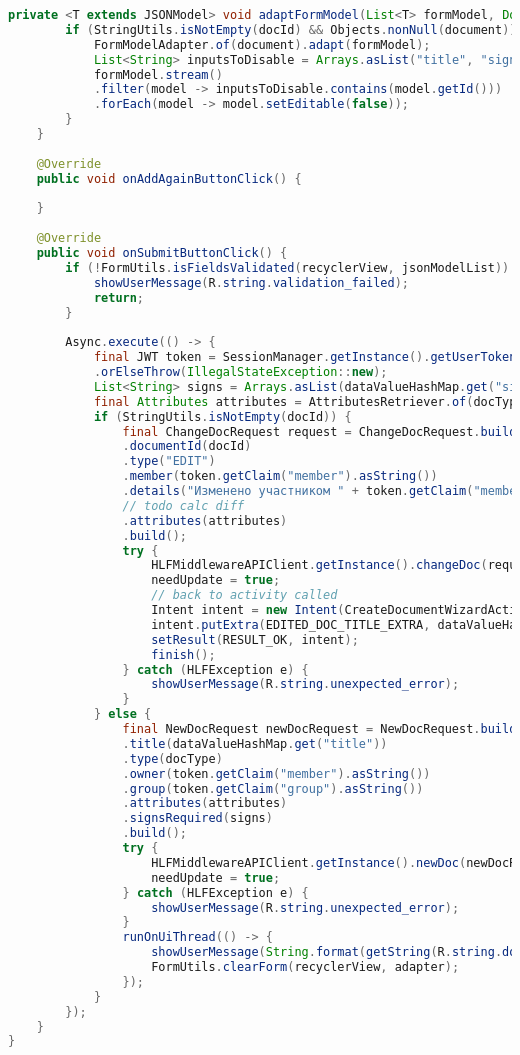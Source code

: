 \begin{lstlisting}[language=Java]
	private <T extends JSONModel> void adaptFormModel(List<T> formModel, Document document) {
		if (StringUtils.isNotEmpty(docId) && Objects.nonNull(document)) {
			FormModelAdapter.of(document).adapt(formModel);
			List<String> inputsToDisable = Arrays.asList("title", "signs");
			formModel.stream()
			.filter(model -> inputsToDisable.contains(model.getId()))
			.forEach(model -> model.setEditable(false));
		}
	}
	
	@Override
	public void onAddAgainButtonClick() {
		
	}
	
	@Override
	public void onSubmitButtonClick() {
		if (!FormUtils.isFieldsValidated(recyclerView, jsonModelList)) {
			showUserMessage(R.string.validation_failed);
			return;
		}
		
		Async.execute(() -> {
			final JWT token = SessionManager.getInstance().getUserToken(ApplicationContext.get())
			.orElseThrow(IllegalStateException::new);
			List<String> signs = Arrays.asList(dataValueHashMap.get("signs").split(","));
			final Attributes attributes = AttributesRetriever.of(docType).retrieve(dataValueHashMap);
			if (StringUtils.isNotEmpty(docId)) {
				final ChangeDocRequest request = ChangeDocRequest.builder()
				.documentId(docId)
				.type("EDIT")
				.member(token.getClaim("member").asString())
				.details("Изменено участником " + token.getClaim("member").asString())
				// todo calc diff
				.attributes(attributes)
				.build();
				try {
					HLFMiddlewareAPIClient.getInstance().changeDoc(request, token.toString());
					needUpdate = true;
					// back to activity called
					Intent intent = new Intent(CreateDocumentWizardActivity.this, DocsToSignFragment.class);
					intent.putExtra(EDITED_DOC_TITLE_EXTRA, dataValueHashMap.get("title"));
					setResult(RESULT_OK, intent);
					finish();
				} catch (HLFException e) {
					showUserMessage(R.string.unexpected_error);
				}
			} else {
				final NewDocRequest newDocRequest = NewDocRequest.builder()
				.title(dataValueHashMap.get("title"))
				.type(docType)
				.owner(token.getClaim("member").asString())
				.group(token.getClaim("group").asString())
				.attributes(attributes)
				.signsRequired(signs)
				.build();
				try {
					HLFMiddlewareAPIClient.getInstance().newDoc(newDocRequest, token.toString());
					needUpdate = true;
				} catch (HLFException e) {
					showUserMessage(R.string.unexpected_error);
				}
				runOnUiThread(() -> {
					showUserMessage(String.format(getString(R.string.doc_created_hint), dataValueHashMap.get("title")));
					FormUtils.clearForm(recyclerView, adapter);
				});
			}
		});
	}
}	
\end{lstlisting}


